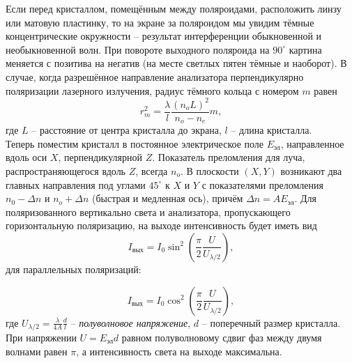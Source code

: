 \documentclass[a4paper, 12pt]{article}
\begin{document}
Если перед кристаллом, помещённым между поляроидами, расположить линзу или матовую пластинку, то на экране за поляроидом мы увидим тёмные концентрические окружности -- результат интерференции обыкновенной и необыкновенной волн. При повороте выходного поляроида на $90^\circ$ картина меняется с позитива на негатив (на месте светлых пятен тёмные и наоборот). В случае, когда разрешённое направление анализатора перпендикулярно поляризации лазерного излучения, радиус тёмного кольца с номером $m$ равен
\begin{equation}
r_m^2 = \dfrac{\lambda}{l} \dfrac{(n_oL)^2}{n_o - n_e}m,
\label{Radius_equation}
\end{equation}
где $L$ -- расстояние от центра кристалла до экрана, $l$ -- длина кристалла.\\
Теперь поместим кристалл в постоянное электрическое поле $E_{\text{эл}}$, направленное вдоль оси $X$, перпендикулярной $Z$. Показатель преломления для луча, распространяющегося вдоль $Z$, всегда $n_o$. В плоскости $(X,Y)$ возникают два главных направления под углами $45^\circ$ к $X$ и $Y$ с показателями преломления $n_0 - \Delta n$ и $n_o + \Delta n$ (быстрая и медленная ось), причём $\Delta n = A E_{\text{эл}}$. Для поляризованного вертикально света и анализатора, пропускающего горизонтальную поляризацию, на выходе интенсивность будет иметь вид
\begin{equation}
I_{\text{вых}} = I_0 \sin^2 \left(\dfrac{\pi}{2} \dfrac{U}{U_{\lambda/2}} \right),
\label{I_sin}
\end{equation}
для параллельных поляризаций:

\begin{equation}
	I_{вых} = I_0 \cos^2 \left(\dfrac{\pi}{2} \dfrac{U}{U_{\lambda/2}} \right),
	\label{I_cos}
\end{equation}
где $U_{\lambda/2} = \frac{\lambda}{4A}\frac{d}{l}$ -- \textit{полуволновое напряжение}, $d$ -- поперечный размер кристалла.  При напряжении $U = E_{\text{эл}}d$ равном полуволновому сдвиг фаз между двумя волнами равен $\pi$, а интенсивность света на выходе максимальна.
\end{document}

